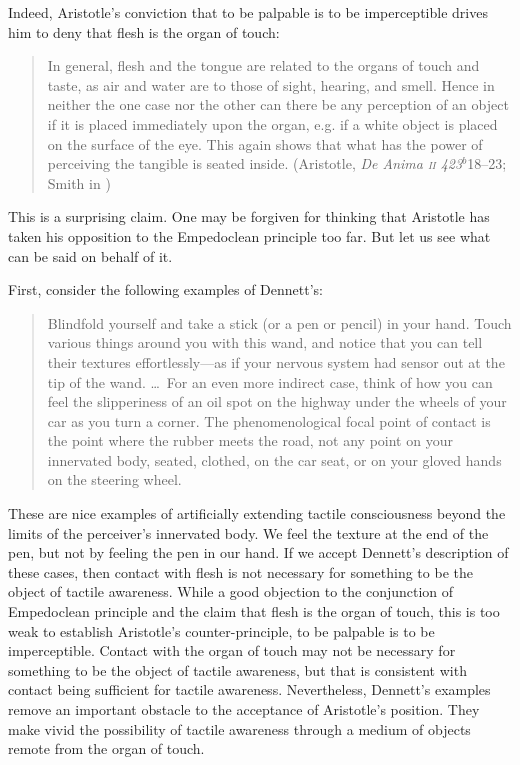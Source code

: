 Indeed, Aristotle's conviction that to be palpable is to be imperceptible drives him to deny that flesh is the organ of touch:
\begin{quote}
    In general, flesh and the tongue are related to the organs of touch and taste, as air and water are to those of sight, hearing, and smell. Hence in neither the one case nor the other can there be any perception of an object if it is placed immediately upon the organ, e.g. if a white object is placed on the surface of the eye. This again shows that what has the power of perceiving the tangible is seated inside. (Aristotle, \emph{De Anima \textsc{ii} 423\( ^{b} \)}18--23; Smith in \citealt[42]{Barnes:1984uq})
\end{quote}
This is a surprising claim. One may be forgiven for thinking that Aristotle has taken his opposition to the Empedoclean principle too far. But let us see what can be said on behalf of it.

First, consider the following examples of Dennett's:
\begin{quote}
    Blindfold yourself and take a stick (or a pen or pencil) in your hand. Touch various things around you with this wand, and notice that you can tell their textures effortlessly---as if your nervous system had sensor out at the tip of the wand. \ldots\ For an even more indirect case, think of how you can feel the slipperiness of an oil spot on the highway under the wheels of your car as you turn a corner. The phenomenological focal point of contact is the point where the rubber meets the road, not any point on your innervated body, seated, clothed, on the car seat, or on your gloved hands on the steering wheel. \citep[47]{Dennett:1993ce}
\end{quote}
These are nice examples of artificially extending tactile consciousness beyond the limits of the perceiver's innervated body. We feel the texture at the end of the pen, but not by feeling the pen in our hand. If we accept Dennett's description of these cases, then contact with flesh is not necessary for something to be the object of tactile awareness. While a good objection to the conjunction of Empedoclean principle and the claim that flesh is the organ of touch, this is too weak to establish Aristotle's counter-principle, to be palpable is to be imperceptible. Contact with the organ of touch may not be necessary for something to be the object of tactile awareness, but that is consistent with contact being sufficient for tactile awareness. Nevertheless, Dennett's examples remove an important obstacle to the acceptance of Aristotle's position. They make vivid the possibility of tactile awareness through a medium of objects remote from the organ of touch.

